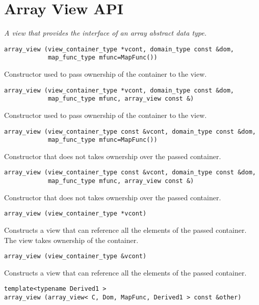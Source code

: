 \section{Array View API } \label{sec-ary-vw}

\emph{A view that provides the interface of an array abstract data type.}

\begin{verbatim}
array_view (view_container_type *vcont, domain_type const &dom,
            map_func_type mfunc=MapFunc())
\end{verbatim}

Constructor used to pass ownership of the container to the view.

\begin{verbatim}
array_view (view_container_type *vcont, domain_type const &dom,
            map_func_type mfunc, array_view const &)
\end{verbatim}

Constructor used to pass ownership of the container to the view.

\begin{verbatim}
array_view (view_container_type const &vcont, domain_type const &dom,
            map_func_type mfunc=MapFunc())
\end{verbatim}

Constructor that does not takes ownership over the passed container.

\begin{verbatim}
array_view (view_container_type const &vcont, domain_type const &dom,
            map_func_type mfunc, array_view const &)
\end{verbatim}

Constructor that does not takes ownership over the passed container.

\begin{verbatim}
array_view (view_container_type *vcont)
\end{verbatim}

Constructs a view that can reference all the elements of the passed container. The view takes ownership of the container.

\begin{verbatim}
array_view (view_container_type &vcont)
\end{verbatim}

Constructs a view that can reference all the elements of the passed container.

\begin{verbatim}
template<typename Derived1 >
array_view (array_view< C, Dom, MapFunc, Derived1 > const &other)
\end{verbatim}


